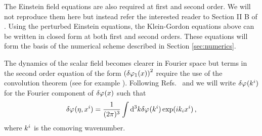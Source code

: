 The Einstein field equations are also required at first and second order. We
will not reproduce them here but instead refer the interested reader to Section
II B of .
Using the perturbed Einstein equations, the Klein-Gordon equations above can be
written in closed form at both first and second orders. These equations will
form the basis of the numerical scheme described in Section \ref{sec:numerics}.


The dynamics of the scalar field becomes clearer in Fourier space but terms in
the second order equation of the form $\left(\delta\varphi_{1}(x)\right)^2$ require the use
of the convolution theorem (see for example ).
Following Refs.~\cite{Malik:2006ir} and \cite{book:liddle} we will write
$\delta\varphi_{}(k^i)$
for the Fourier component of $\delta\varphi_{}(x)$ such that
% 
\begin{equation}
 \delta\varphi_{}(\eta, x^i) = \frac{1}{(2 \pi)^3} \int \mathrm{d}^3k \delta\varphi_{}(k^i) \exp (i k_i
x^i)
\,,
\end{equation}
% 
where $k^i$ is the comoving wavenumber.


